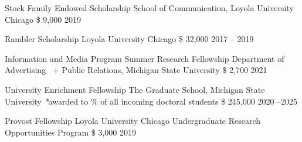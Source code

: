 \begin{cvhonors}

  \cvhonor
    {Stock Family Endowed Scholarship} %
    {School of Communication, Loyola University Chicago} %
    {\$ 9,000} %
    {2019} %
\end{cvhonors}

\begin{cvhonors}

  \cvhonor
    {Rambler Scholarship} %
    { Loyola University Chicago
} %
    {\$ 32,000} %
    {2017 -- 2019} %
\end{cvhonors}


\begin{cvhonors}
  \cvhonor
    {Information and Media Program Summer Research Fellowship} 
    {Department of Advertising \ +  Public Relations,
    Michigan State University } 
    {\$ 2,700} 
    {2021} 

  \cvhonor
    {University Enrichment Fellowship} %
    {The Graduate School, Michigan State University \scriptsize{\textit{*}awarded to  \% of all incoming doctoral students}} %
    {\$ 245,000} %
    {2020 --2025} %
    
  \cvhonor
    {Provost Fellowship} 
    {Loyola University Chicago Undergraduate Research Opportunities Program } 
    {\$ 3,000} 
    {2019} 
\end{cvhonors}
\newpage
